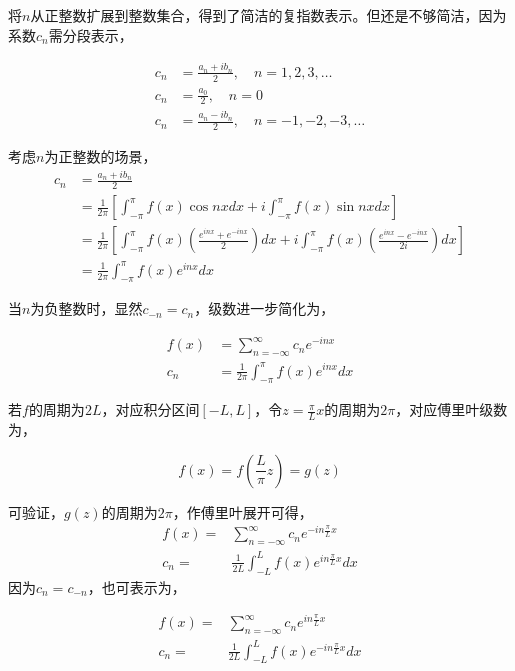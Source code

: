 将$n$从正整数扩展到整数集合，得到了简洁的复指数表示。但还是不够简洁，因为系数$c_n$需分段表示，

\begin{align*}
	c_n &= \frac{a_n + ib_n}{2}, \quad n=1,2,3,\dots\\
	c_n &= \frac{a_0}{2}, \quad n=0\\
	c_n &= \frac{a_n - ib_n}{2}, \quad n=-1,-2,-3,\dots
\end{align*}

考虑$n$为正整数的场景，
\begin{align*}
	c_n &= \frac{a_n + ib_n}{2}\\
		&= \frac{1}{2\pi}
			\left[
				\int_{-\pi}^{\pi}f(x)\cos nx dx + i\int_{-\pi}^{\pi}f(x)\sin nx dx
			\right] \\
		&= \frac{1}{2\pi}\left[
			\int_{-\pi}^{\pi}f(x)
			\left(
				\frac{e^{inx}+e^{-inx}}{2}
			\right) dx 
			+ i\int_{-\pi}^{\pi}f(x)
			\left(
				\frac{e^{inx} -e^{-inx}}{2i}
			\right) dx
		\right]\\
		&=\frac{1}{2\pi}\int_{-\pi}^{\pi}f(x)e^{inx}dx
\end{align*}

当$n$为负整数时，显然$c_{-n} = c_n$，级数进一步简化为，

\begin{align}
	f(x) &= \sum_{n=-\infty}^{\infty}c_n e^{-inx}\\
	c_n &= \frac{1}{2\pi}\int_{-\pi}^{\pi}f(x)e^{inx}dx
\end{align}


若$f$的周期为$2L$，对应积分区间$[-L,L]$，令$z = \frac{\pi}{L}x$的周期为$2\pi$，对应傅里叶级数为，

$$
	f(x) = f(\frac{L}{\pi}z) = g(z)
$$

可验证，$g(z)$的周期为$2\pi$，作傅里叶展开可得，
\begin{equation}\label{f_series_form1}
	\begin{aligned}
		f(x)= &\sum_{n=-\infty}^{\infty}c_ne^{-in\frac{\pi}{L}x}\\
		c_n =& \frac{1}{2L}\int_{-L}^L f(x) e^{in\frac{\pi}{L}x}dx
	\end{aligned}
\end{equation}
因为$c_n = c_{-n}$，也可表示为，

\begin{equation}
	\begin{aligned}\label{f_series_form2}
		f(x)= &\sum_{n=-\infty}^{\infty}c_ne^{in\frac{\pi}{L}x}\\
		c_n =& \frac{1}{2L}\int_{-L}^L f(x) e^{-in\frac{\pi}{L}x}dx
	\end{aligned}
\end{equation}

